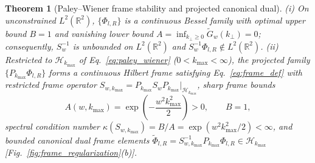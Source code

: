 \documentclass[aps,pra,reprint,nofootinbib,floatfix,longbibliography]{revtex4-2}
\newtheorem{theorem}{Theorem}
\theoremstyle{remark}
\begin{document}
\begin{theorem}[Paley--Wiener frame stability and projected canonical dual]
\label{thm:pw_bounds}
(i) On unconstrained $L^2(\mathbb{R}^2)$, $\{\Phi_{l,R}\}$ is a continuous Bessel family with optimal upper bound $B = 1$ and vanishing lower bound $A = \inf_{k_\perp \ge 0}\widetilde{G}_w(k_\perp) = 0$; consequently, $S_w^{-1}$ is unbounded on $L^2(\mathbb{R}^2)$ and $S_w^{-1}\Phi_{l,R} \notin L^2(\mathbb{R}^2)$. (ii) Restricted to $\mathcal{H}_{k_{\max}}$ of Eq.~\eqref{eq:paley_wiener} ($0 < k_{\max} < \infty$), the projected family $\{P_{k_{\max}}\Phi_{l,R}\}$ forms a continuous Hilbert frame satisfying Eq.~\eqref{eq:frame_def} with restricted frame operator $S_{w,k_{\max}} = P_{k_{\max}} S_w P_{k_{\max}}\big|_{\mathcal{H}_{k_{\max}}}$, sharp frame bounds
\begin{equation}
A(w,k_{\max}) = \exp\!\left(-\frac{w^2 k_{\max}^2}{2}\right) > 0, \qquad B = 1,
\label{eq:pw_bounds}
\end{equation}
spectral condition number $\kappa(S_{w,k_{\max}}) = B/A = \exp(w^2 k_{\max}^2/2) < \infty$, and bounded canonical dual frame elements $\widetilde{\Phi}_{l,R} = S_{w,k_{\max}}^{-1}P_{k_{\max}}\Phi_{l,R} \in \mathcal{H}_{k_{\max}}$ [Fig.~\ref{fig:frame_regularization}(b)].
\end{theorem}
\end{document}
